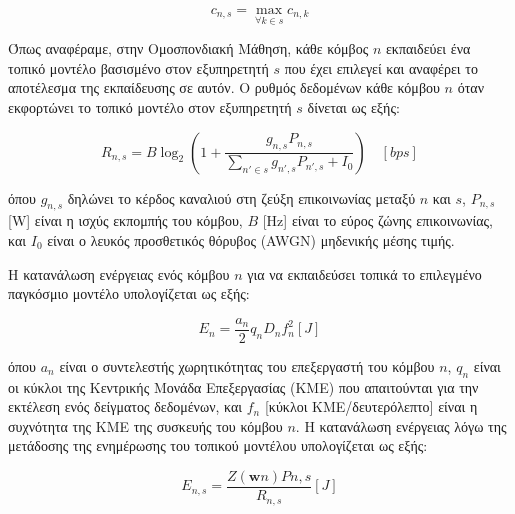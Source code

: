 \begin{equation}
c_{n,s}=\max\limits_{\forall k \in s} c_{n,k}
\label{eq2}
\end{equation}

\noindent
Όπως αναφέραμε, στην Ομοσπονδιακή Μάθηση, κάθε κόμβος $n$ εκπαιδεύει ένα τοπικό μοντέλο βασισμένο στον εξυπηρετητή $s$ που έχει επιλεγεί και αναφέρει το αποτέλεσμα της εκπαίδευσης σε αυτόν. Ο ρυθμός δεδομένων κάθε κόμβου $n$ όταν εκφορτώνει το τοπικό μοντέλο στον εξυπηρετητή $s$ δίνεται ως εξής:

\vspace{-5pt}

\begin{equation}
R_{n,s} = B \log_2(1 + \frac{g_{n,s} P_{n,s}}{\sum \limits_{n'\in s} g_{n',s}P_{n',s} + I_0}) \quad [bps]
\label{eq3}
\end{equation}

\vspace{-3pt}

\noindent
όπου $g_{n,s}$ δηλώνει το κέρδος καναλιού στη ζεύξη επικοινωνίας μεταξύ $n$ και $s$, $P_{n,s}$ [W] είναι η ισχύς εκπομπής του κόμβου, $B$ [Hz] είναι το εύρος ζώνης επικοινωνίας, και $I_0$ είναι ο λευκός προσθετικός θόρυβος (AWGN) μηδενικής μέσης τιμής.

Η κατανάλωση ενέργειας ενός κόμβου $n$ για να εκπαιδεύσει τοπικά το επιλεγμένο παγκόσμιο μοντέλο υπολογίζεται ως εξής:

\vspace{-5pt}

\begin{equation}
E_n=\frac{a_n}{2}q_nD_nf_n^2 [J]
\label{eq4}
\end{equation}

\vspace{-3pt}

\noindent
όπου $a_n$ είναι ο συντελεστής χωρητικότητας του επεξεργαστή του κόμβου $n$, $q_n$ είναι οι κύκλοι της Κεντρικής Μονάδα Επεξεργασίας (ΚΜΕ) που απαιτούνται για την εκτέλεση ενός δείγματος δεδομένων, και $f_n$ [κύκλοι ΚΜΕ/δευτερόλεπτο] είναι η συχνότητα της ΚΜΕ της συσκευής του κόμβου $n$. Η κατανάλωση ενέργειας λόγω της μετάδοσης της ενημέρωσης του τοπικού μοντέλου υπολογίζεται ως εξής:

\vspace{-5pt}

\begin{equation}
E_{n,s}=\frac{Z(\mathbf{w}n)P{n,s}}{R_{n,s}}[J]
\label{eq5}
\end{equation}

